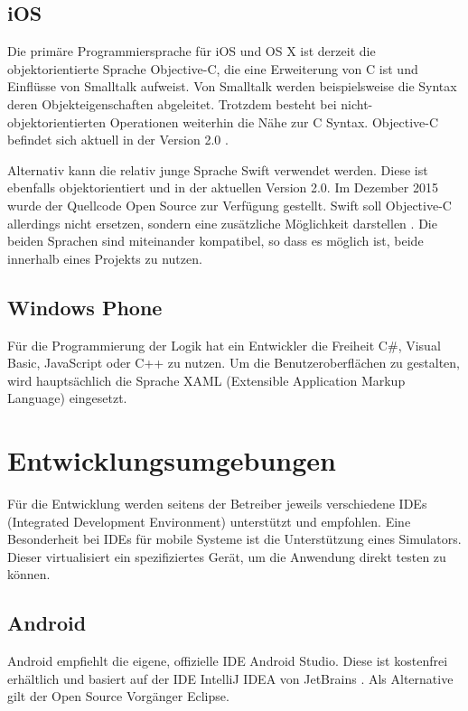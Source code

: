 \subsection{iOS}
Die primäre Programmiersprache für iOS und OS X ist derzeit die objektorientierte Sprache Objective-C, die eine Erweiterung von C ist und Einflüsse von Smalltalk aufweist. Von Smalltalk werden beispielsweise die Syntax deren Objekteigenschaften abgeleitet. Trotzdem besteht bei nicht-objektorientierten Operationen weiterhin die Nähe zur C Syntax. Objective-C befindet sich aktuell in der Version 2.0 \citep{objectiveC_about}.

Alternativ kann die relativ junge Sprache Swift verwendet werden. Diese ist ebenfalls objektorientiert und in der aktuellen Version 2.0. Im Dezember 2015 wurde der Quellcode Open Source zur Verfügung gestellt. Swift soll Objective-C allerdings nicht ersetzen, sondern eine zusätzliche Möglichkeit darstellen \citep{swift_about}. Die beiden Sprachen sind miteinander kompatibel, so dass es möglich ist, beide innerhalb eines Projekts zu nutzen.

\subsection{Windows Phone}
Für die Programmierung der Logik hat ein Entwickler die Freiheit C\#, Visual Basic, JavaScript oder C++ zu nutzen. Um die Benutzeroberflächen zu gestalten, wird hauptsächlich die Sprache XAML (Extensible Application Markup Language) eingesetzt. 


\section{Entwicklungsumgebungen}
Für die Entwicklung werden seitens der Betreiber jeweils verschiedene IDEs (Integrated Development Environment)  unterstützt und empfohlen. Eine Besonderheit bei IDEs für mobile Systeme ist die Unterstützung eines Simulators. Dieser virtualisiert ein spezifiziertes Gerät, um die Anwendung direkt testen zu können.

\subsection{Android}
Android empfiehlt die eigene, offizielle IDE Android Studio. Diese ist kostenfrei erhältlich und basiert auf der IDE IntelliJ IDEA von JetBrains \citep{android_studio}. Als Alternative gilt der Open Source Vorgänger Eclipse.

